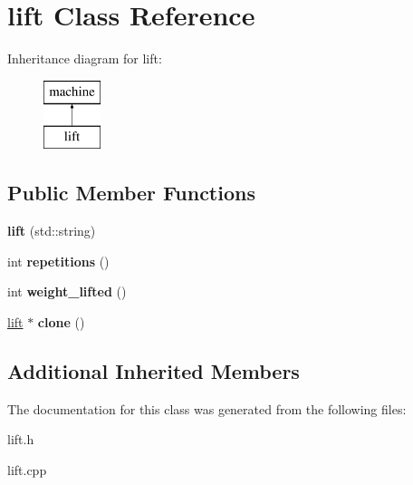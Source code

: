 \hypertarget{classlift}{\section{lift Class Reference}
\label{classlift}
}
Inheritance diagram for lift\-:\begin{figure}[H]
\begin{center}
\leavevmode
\includegraphics[height=2.000000cm]{classlift}
\end{center}
\end{figure}
\subsection*{Public Member Functions}
\begin{DoxyCompactItemize}
\item 
\hypertarget{classlift_aa02bdf50dbf3026c92d06be31553f63d}{{\bfseries lift} (std\-::string)}\label{classlift_aa02bdf50dbf3026c92d06be31553f63d}

\item 
\hypertarget{classlift_a9f371f20603a92b21141ebc31503b0d7}{int {\bfseries repetitions} ()}\label{classlift_a9f371f20603a92b21141ebc31503b0d7}

\item 
\hypertarget{classlift_aaabecf780e0d0e1ed433fc92b301551f}{int {\bfseries weight\-\_\-lifted} ()}\label{classlift_aaabecf780e0d0e1ed433fc92b301551f}

\item 
\hypertarget{classlift_a53f33acfb2b218cfdc7888bdaca73cf6}{\hyperlink{classlift}{lift} $\ast$ {\bfseries clone} ()}\label{classlift_a53f33acfb2b218cfdc7888bdaca73cf6}

\end{DoxyCompactItemize}
\subsection*{Additional Inherited Members}


The documentation for this class was generated from the following files\-:\begin{DoxyCompactItemize}
\item 
lift.\-h\item 
lift.\-cpp\end{DoxyCompactItemize}
